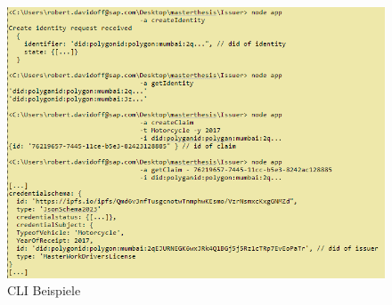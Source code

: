\begin{itemize}
	\begin{figure}[H]
		\centering
		\includegraphics[scale=0.7]{media/CLI3}
		\caption{CLI Beispiele}
		\label{fig:CLI}
	\end{figure}
	

\end{itemize}
